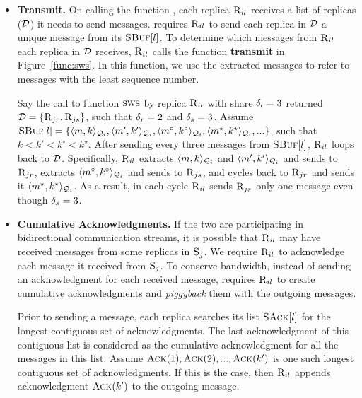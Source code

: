 \begin{itemize}[wide]
 

\item {\bf Transmit.}
On calling the function \SWS{}, each replica $\textsc{R}_{{i}{l}}$ receives a list of replicas ($\mathcal{D}$) it needs 
to send messages.
\Scrooge{} requires $\textsc{R}_{{i}{l}}$ to send each replica in $\mathcal{D}$ a unique message from its $\textsc{SBuf}[{l}]$.
To determine which messages from $\textsc{R}_{{i}{l}} $ each replica in $\mathcal{D}$ receives, $\textsc{R}_{{i}{l}}$ calls the function 
{\bf transmit} in Figure~\ref{func:sws}.
In this function, we use the extracted messages to refer to messages with the least sequence number.

\begin{example}
Say the call to function $\textsc{sws}{}$ by replica $\textsc{R}_{{i}{l}}$ with share ${\delta}_{l} = 3$ returned 
$\mathcal{D}{} = \{\textsc{R}_{{j}{r}}, \textsc{R}_{{j}{s}} \}$, such that ${\delta}_{r} = 2$ and ${\delta}_{s} = 3$.
Assume $\textsc{SBuf}[{l}] = \{ \langle m,k\rangle_{\mathcal{Q}_{i}}, \langle m',k'\rangle_{\mathcal{Q}_{i}}, \langle m^\circ,k^\circ\rangle_{\mathcal{Q}_{i}}, \langle m^{\star},k^{\star}\rangle_{\mathcal{Q}_{i}},... \}$, 
such that $k < k' < k^\circ < k^\star$.
After sending every three messages from $\textsc{SBuf}[{l}]$, $\textsc{R}_{{i}{l}}$ loops back to $\mathcal{D}$.
Specifically, $\textsc{R}_{{i}{l}}$ extracts $\langle m,k\rangle_{\mathcal{Q}_{i}}$ and $\langle m',k'\rangle_{\mathcal{Q}_{i}}$ and sends to $\textsc{R}_{{j}{r}}$, 
extracts $\langle m^\circ,k^\circ\rangle_{\mathcal{Q}_{i}}$ and sends to $\textsc{R}_{{j}{s}}$, and cycles back to $\textsc{R}_{{j}{r}}$
and sends it $\langle m^{\star},k^{\star}\rangle_{\mathcal{Q}_{i}}$.
As a result, in each cycle $\textsc{R}_{{i}{l}}$ sends $\textsc{R}_{{j}{s}}$ only one message even though ${\delta}_{s} = 3$.

\end{example}





\item {\bf Cumulative Acknowledgments.}
If the two  are participating in bidirectional communication streams,  
it is possible that $\textsc{R}_{{i}{l}}$ may have received messages from some replicas in \RSM{} $\textsc{S}_{j}$.
We require $\textsc{R}_{{i}{l}}$ to acknowledge each message it received from \RSM{} $\textsc{S}_{j}$. 
To conserve bandwidth, instead of sending an acknowledgment for each received message, 
\Scrooge{} requires $\textsc{R}_{{i}{l}}$ to create cumulative acknowledgments and {\em piggyback} them with 
the outgoing messages.

Prior to sending a message,
each replica searches its list $\textsc{SAck}[{l}]$ for the longest contiguous set of acknowledgments.
The last acknowledgment of this contiguous list is considered as the cumulative acknowledgment for all the 
messages in this list. 
Assume $\textsc{Ack}(1), \textsc{Ack}(2), ... , \textsc{Ack}(k')$ is one such longest contiguous set of acknowledgments.
If this is the case, then $\textsc{R}_{{i}{l}}$ appends acknowledgment $\textsc{Ack}(k')$ to the outgoing message.



\end{itemize}

